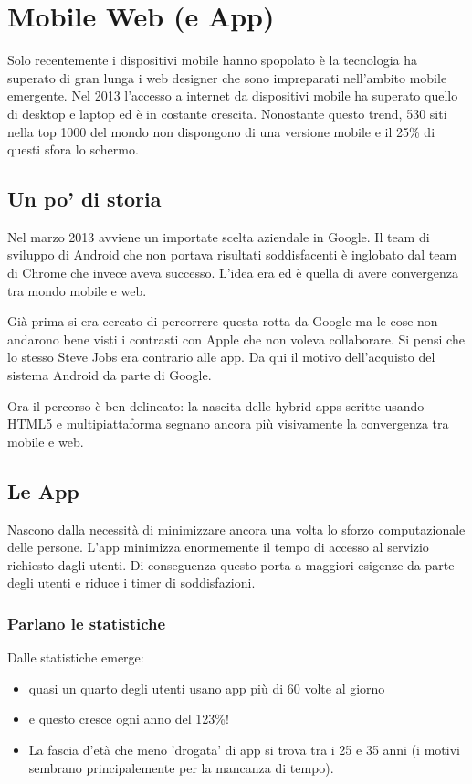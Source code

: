 
\chapter{Mobile Web (e App)}
	Solo recentemente i dispositivi mobile hanno spopolato è la tecnologia ha superato di gran lunga i web designer che sono impreparati nell'ambito mobile emergente. Nel 2013 l'accesso a internet da dispositivi mobile ha superato quello di desktop e laptop ed è in costante crescita. Nonostante questo trend, 530 siti nella top 1000 del mondo non dispongono di una versione mobile e il 25\% di questi sfora lo schermo.

	\section{Un po' di storia}
		Nel marzo 2013 avviene un importate scelta aziendale in Google. Il team di sviluppo di Android che non portava risultati soddisfacenti è inglobato dal team di Chrome che invece aveva successo. L'idea era ed è quella di avere convergenza tra mondo mobile e web. 
		
		Già prima si era cercato di percorrere questa rotta da Google ma le cose non andarono bene visti i contrasti con Apple che non voleva collaborare. Si pensi che lo stesso Steve Jobs era contrario alle app. Da qui il motivo dell'acquisto del sistema Android da parte di Google.
		
		Ora il percorso è ben delineato: la nascita delle hybrid apps scritte usando HTML5 e multipiattaforma segnano ancora più visivamente la convergenza tra mobile e web.
	
	\section{Le App}
		Nascono dalla necessità di minimizzare ancora una volta lo sforzo computazionale delle persone. L'app minimizza enormemente il tempo di accesso al servizio richiesto dagli utenti. Di conseguenza questo porta a maggiori esigenze da parte degli utenti e riduce i timer di soddisfazioni.
		
		\subsection{Parlano le statistiche}
			Dalle statistiche emerge:
			\begin{itemize}
				\item quasi un quarto degli utenti usano app più di 60 volte al giorno 
				\item e questo cresce ogni anno del 123\%!
				\item La fascia d'età che meno 'drogata' di app si trova tra i 25 e 35 anni (i motivi sembrano principalemente per la mancanza di tempo).
			\end{itemize}


